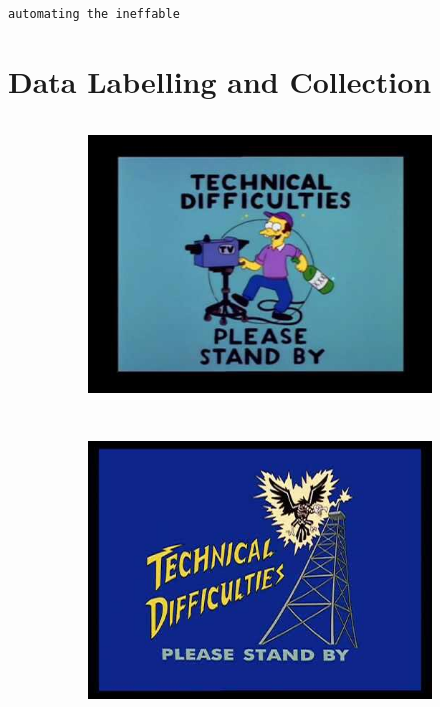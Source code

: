 \documentclass[
  letterpaper,
  DIV=11,
  numbers=noendperiod]{scrreprt}
\begin{document}
\texttt{automating\ the\ ineffable}

\chapter{Data Labelling and
Collection}\label{data-labelling-and-collection}

\begin{figure}

\begin{minipage}{0.50\linewidth}

\begin{figure}[H]

{\centering \includegraphics[width=\textwidth,height=3in]{quarto_docs/../img/technical_difficulties_1.png}

}


\end{figure}%

\end{minipage}%
%
\begin{minipage}{0.50\linewidth}

\begin{figure}[H]

{\centering \includegraphics[width=\textwidth,height=3in]{quarto_docs/../img/technical_difficulties_2.png}

}
\end{figure}
\end{minipage}
\end{figure}
\end{document}
